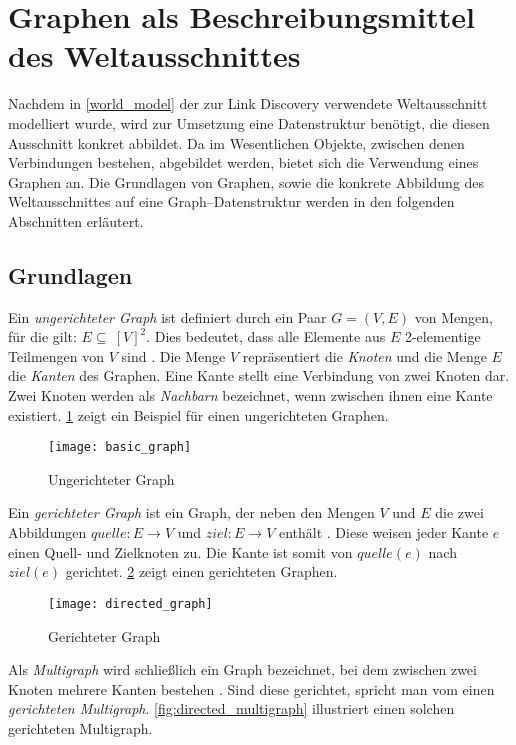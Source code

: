 \section{Graphen als Beschreibungsmittel des Weltausschnittes}
\label{graphs}

Nachdem in \cref{world_model} der zur Link Discovery verwendete Weltausschnitt modelliert wurde, wird zur Umsetzung eine Datenstruktur benötigt, die diesen Ausschnitt konkret abbildet. Da im Wesentlichen Objekte, zwischen denen Verbindungen bestehen, abgebildet werden, bietet sich die Verwendung eines Graphen an. Die Grundlagen von Graphen, sowie die konkrete Abbildung des Weltausschnittes auf eine Graph--Datenstruktur werden in den folgenden Abschnitten erläutert.

\subsection{Grundlagen}
\label{graph_basics}

Ein \emph{ungerichteter Graph} ist definiert durch ein Paar \(G = (V,E)\) von Mengen, für die gilt: \(E \subseteq\ [V]^2\). Dies bedeutet, dass alle Elemente aus \(E\) 2-elementige Teilmengen von \(V\) sind \cite[S. 2]{rd2012}. Die Menge \(V\) repräsentiert die \emph{Knoten} und die Menge \(E\) die \emph{Kanten} des Graphen. Eine Kante stellt eine Verbindung von zwei Knoten dar. Zwei Knoten werden als \emph{Nachbarn} bezeichnet, wenn zwischen ihnen eine Kante existiert. \cref{fig:basic_graph} zeigt ein Beispiel für einen ungerichteten Graphen.

\begin{figure}
\centering
\texttt{[image: basic\_graph]}
\caption{Ungerichteter Graph}
\label{fig:basic_graph}
\end{figure}

Ein \emph{gerichteter Graph} ist ein Graph, der neben den Mengen \(V\) und \(E\) die zwei Abbildungen \(quelle: E \rightarrow V\) und \(ziel: E \rightarrow V\) enthält \cite[S. 25]{rd2012}. Diese weisen jeder Kante \(e\) einen Quell- und Zielknoten zu. Die Kante ist somit von \(quelle(e)\) nach \(ziel(e)\) gerichtet. \cref{fig:directed_graph} zeigt einen gerichteten Graphen.

\begin{figure}
\centering
\texttt{[image: directed\_graph]}
\caption{Gerichteter Graph}
\label{fig:directed_graph}
\end{figure}

Als \emph{Multigraph} wird schließlich ein Graph bezeichnet, bei dem zwischen zwei Knoten mehrere Kanten bestehen \cite[S. 25]{rd2012}. Sind diese gerichtet, spricht man vom einen \emph{gerichteten Multigraph}. \cref{fig:directed_multigraph} illustriert einen solchen gerichteten Multigraph.

